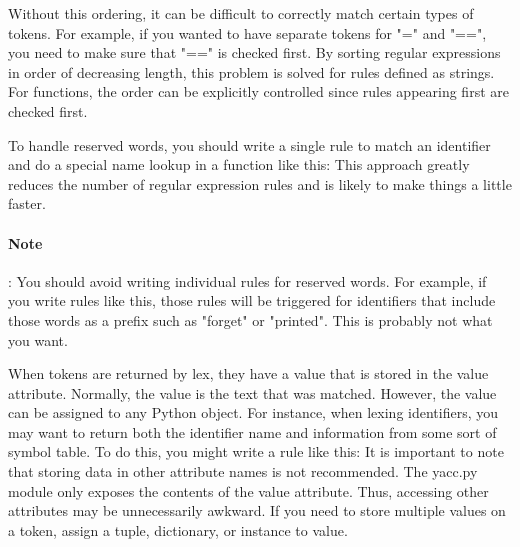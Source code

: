 Without this ordering, it can be difficult to correctly match certain types of
tokens. For example, if you wanted to have separate tokens for "=" and "==", you
need to make sure that "==" is checked first. By sorting regular expressions in
order of decreasing length, this problem is solved for rules defined as strings.
For functions, the order can be explicitly controlled since rules appearing
first are checked first.

To handle reserved words, you should write a single rule to match an identifier
and do a special name lookup in a function like this:
This approach greatly reduces the number of regular expression rules and is
likely to make things a little faster.

\paragraph{Note}: You should avoid writing individual rules for reserved words.
For example, if you write rules like this,
those rules will be triggered for identifiers that include those words as a
prefix such as "forget" or "printed". This is probably not what you want.


When tokens are returned by lex, they have a value that is stored in the value
attribute. Normally, the value is the text that was matched. However, the value
can be assigned to any Python object. For instance, when lexing identifiers, you
may want to return both the identifier name and information from some sort of
symbol table. To do this, you might write a rule like this:
It is important to note that storing data in other attribute names is not
recommended. The yacc.py module only exposes the contents of the value
attribute. Thus, accessing other attributes may be unnecessarily awkward. If you
need to store multiple values on a token, assign a tuple, dictionary, or
instance to value.

\secup
